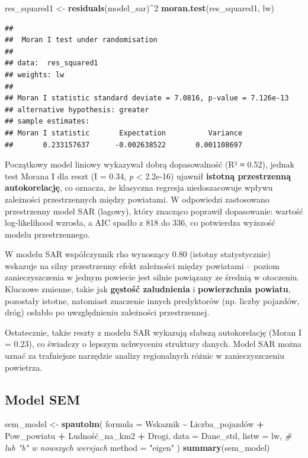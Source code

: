 \documentclass[
  11pt,
]{article}
\newenvironment{Shaded}{\begin{snugshade}}{\end{snugshade}}
\newcommand{\AttributeTok}[1]{\textcolor[rgb]{0.13,0.29,0.53}{#1}}
\newcommand{\CommentTok}[1]{\textcolor[rgb]{0.56,0.35,0.01}{\textit{#1}}}
\newcommand{\DecValTok}[1]{\textcolor[rgb]{0.00,0.00,0.81}{#1}}
\newcommand{\FunctionTok}[1]{\textcolor[rgb]{0.13,0.29,0.53}{\textbf{#1}}}
\newcommand{\NormalTok}[1]{#1}
\newcommand{\OtherTok}[1]{\textcolor[rgb]{0.56,0.35,0.01}{#1}}
\newcommand{\SpecialCharTok}[1]{\textcolor[rgb]{0.81,0.36,0.00}{\textbf{#1}}}
\newcommand{\StringTok}[1]{\textcolor[rgb]{0.31,0.60,0.02}{#1}}
\begin{document}
\begin{Shaded}
\begin{Highlighting}[]
\NormalTok{res\_squared1 }\OtherTok{\textless{}{-}} \FunctionTok{residuals}\NormalTok{(model\_sar)}\SpecialCharTok{\^{}}\DecValTok{2}
\FunctionTok{moran.test}\NormalTok{(res\_squared1, lw)}
\end{Highlighting}
\end{Shaded}

\begin{verbatim}
## 
##  Moran I test under randomisation
## 
## data:  res_squared1  
## weights: lw    
## 
## Moran I statistic standard deviate = 7.0816, p-value = 7.126e-13
## alternative hypothesis: greater
## sample estimates:
## Moran I statistic       Expectation          Variance 
##       0.233157637      -0.002638522       0.001108697
\end{verbatim}

Początkowy model liniowy wykazywał dobrą dopasowalność (R² ≈ 0.52),
jednak test Morana I dla reszt (I = 0.34, \emph{p} \textless{} 2.2e‑16)
ujawnił \textbf{istotną przestrzenną autokorelację}, co oznacza, że
klasyczna regresja niedoszacowuje wpływu zależności przestrzennych
między powiatami. W odpowiedzi zastosowano przestrzenny model SAR
(lagowy), który znacząco poprawił dopasowanie: wartość log-likelihood
wzrosła, a AIC spadło z 818 do 336, co potwierdza wyższość modelu
przestrzennego.

W modelu SAR współczynnik rho wynoszący 0.80 (istotny statystycznie)
wskazuje na silny przestrzenny efekt zależności między powiatami --
poziom zanieczyszczenia w jednym powiecie jest silnie powiązany ze
średnią w otoczeniu. Kluczowe zmienne, takie jak \textbf{gęstość
zaludnienia} i \textbf{powierzchnia powiatu}, pozostały istotne,
natomiast znaczenie innych predyktorów (np. liczby pojazdów, dróg)
osłabło po uwzględnieniu zależności przestrzennej.

Ostatecznie, także reszty z modelu SAR wykazują słabszą autokorelację
(Moran I = 0.23), co świadczy o lepszym uchwyceniu struktury danych.
Model SAR można uznać za trafniejsze narzędzie analizy regionalnych
różnic w zanieczyszczeniu powietrza.

\subsection{Model SEM}\label{model-sem}

\begin{Shaded}
\begin{Highlighting}[]
\NormalTok{sem\_model }\OtherTok{\textless{}{-}} \FunctionTok{spautolm}\NormalTok{(}
  \AttributeTok{formula =}\NormalTok{ Wskaznik }\SpecialCharTok{\textasciitilde{}}\NormalTok{ Liczba\_pojazdów }\SpecialCharTok{+}\NormalTok{ Pow\_powiatu }\SpecialCharTok{+}\NormalTok{ Ludność\_na\_km2 }\SpecialCharTok{+}\NormalTok{ Drogi,}
  \AttributeTok{data =}\NormalTok{ Dane\_std,}
  \AttributeTok{listw =}\NormalTok{ lw,  }\CommentTok{\# lub "b" w nowszych wersjach}
  \AttributeTok{method =} \StringTok{"eigen"}
\NormalTok{)}
\FunctionTok{summary}\NormalTok{(sem\_model)}
\end{Highlighting}
\end{Shaded}
\end{document}
